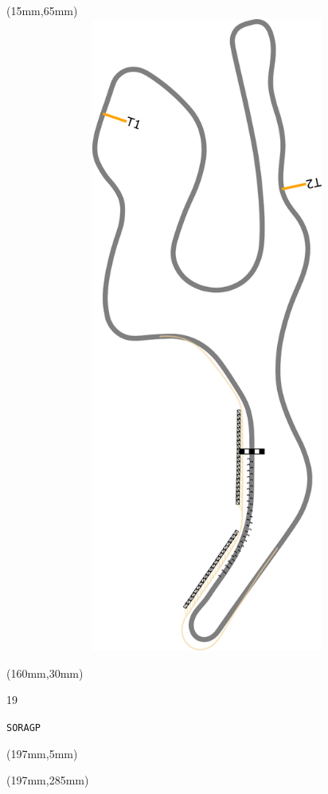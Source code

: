 \begin{textblock*}{185mm}(15mm,65mm)%
\centering
\mbox{\includegraphics[width=185mm,height=210mm,keepaspectratio]{PT/SORAGP.pdf}}
\end{textblock*}
\begin{textblock*}{40mm}(160mm,30mm)%
\Large
\par{} 
\par19 
\par\hfill\tiny\tt SORAGP\\
\end{textblock*}
\begin{textblock*}{20mm}(197mm,5mm)%
\fbox{\thepage}
\label{SORAGP}
\end{textblock*}
\begin{textblock*}{20mm}(197mm,285mm)%
\fbox{\thepage}
\end{textblock*}

